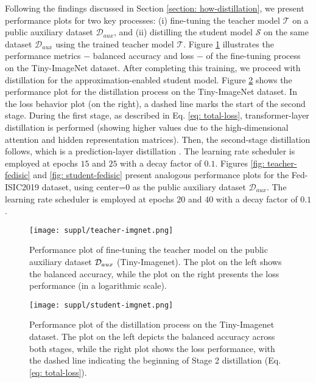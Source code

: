Following the findings discussed in Section \ref{section: how-distillation}, we present performance plots for two key processes: (i) fine-tuning the teacher model $\mathcal{T}$ on a public auxiliary dataset $\mathcal{D}_{aux}$, and (ii) distilling the student model $\mathcal{S}$ on the same dataset $\mathcal{D}_{aux}$ using the trained teacher model $\mathcal{T}$. Figure \ref{fig: teacher-imgnet} illustrates the performance metrics $-$ balanced accuracy and loss $-$ of the fine-tuning process on the Tiny-ImageNet dataset. After completing this training, we proceed with distillation for the approximation-enabled student model. Figure \ref{fig: student-imgnet} shows the performance plot for the distillation process on the Tiny-ImageNet dataset. In the loss behavior plot (on the right), a dashed line marks the start of the second stage. During the first stage, as described in Eq. \ref{eq: total-loss}, transformer-layer distillation is performed (showing higher values due to the high-dimensional attention and hidden representation matrices). Then, the second-stage distillation follows, which is a prediction-layer distillation \cite{hinton2015distilling}. The learning rate scheduler is employed at epochs $15$ and $25$ with a decay factor of $0.1$. Figures \ref{fig: teacher-fedisic} and \ref{fig: student-fedisic} present analogous performance plots for the Fed-ISIC2019 dataset, using center=0 as the public auxiliary dataset $\mathcal{D}_{aux}$. The learning rate scheduler is employed at epochs $20$ and $40$ with a decay factor of $0.1$. 


\begin{figure}
    \centering
    \texttt{[image: suppl/teacher-imgnet.png]}
    \caption{Performance plot of fine-tuning the teacher model on the public auxiliary dataset ${\mathcal{D}}_{aux}$ (Tiny-Imagenet). The plot on the left shows the balanced accuracy, while the plot on the right presents the loss performance (in a logarithmic scale). } 
    \label{fig: teacher-imgnet}
\end{figure}

\begin{figure}
    \centering
    \texttt{[image: suppl/student-imgnet.png]}
    \caption{Performance plot of the distillation process on the Tiny-Imagenet dataset. The plot on the left depicts the balanced accuracy across both stages, while the right plot shows the loss performance, with the dashed line indicating the beginning of Stage 2 distillation (Eq. \ref{eq: total-loss}).} 
    \label{fig: student-imgnet} 
\end{figure}

